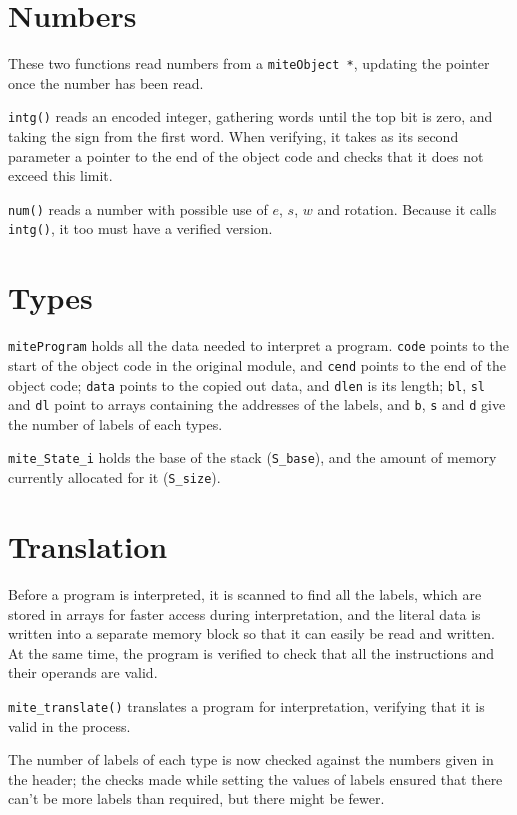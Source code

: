 \documentclass[english]{scrartcl}
\begin{document}
\section{Numbers} \label{numbers}

These two functions read numbers from a \verb|miteObject *|, updating
the pointer once the number has been read.

\verb|intg()| reads an encoded integer, gathering words until the top
bit is zero, and taking the sign from the first word. When verifying,
it takes as its second parameter a pointer to the end of the object
code and checks that it does not exceed this limit.

\verb|num()| reads a number with possible use of $e$, $s$, $w$ and rotation.
Because it calls \verb|intg()|, it too must have a verified version.



\section{Types}

\verb|miteProgram| holds all the data needed to interpret a program.
\verb|code| points to the start of the object code in the original
module, and \verb|cend| points to the end of the object code;
\verb|data| points to the copied out data, and \verb|dlen| is its
length; \verb|bl|, \verb|sl| and \verb|dl| point to arrays containing
the addresses of the labels, and \verb|b|, \verb|s| and \verb|d| give
the number of labels of each types.

\verb|mite_State_i| holds the base of the stack (\verb|S_base|), and
the amount of memory currently allocated for it (\verb|S_size|).



\section{Translation}

Before a program is interpreted, it is scanned to find all the labels,
which are stored in arrays for faster access during interpretation,
and the literal data is written into a separate memory block so that
it can easily be read and written. At the same time, the program is
verified to check that all the instructions and their operands are
valid.

\verb|mite_translate()| translates a program for interpretation,
verifying that it is valid in the process.

The number of labels of each type is now checked against the numbers
given in the header; the checks made while setting the values of
labels ensured that there can't be more labels than required, but
there might be fewer.
\end{document}
